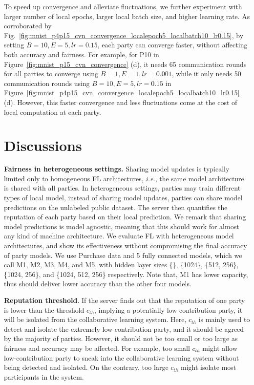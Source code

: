\documentclass{article}
\newcommand{\ie}{\textit{i.e.},\xspace}
\begin{document}
To speed up convergence and alleviate fluctuations, we further experiment with larger number of local epochs, larger local batch size, and higher learning rate. As corroborated by Fig.~\ref{fig:mnist_p4p15_cvn_convergence_localepoch5_localbatch10_lr0.15}, by setting $B=10, E=5, lr=0.15$, each party can converge faster, without affecting both accuracy and fairness. For example, for P10 in Figure~\ref{fig:mnist_p15_cvn_convergence} (d), it needs 65 communication rounds for all parties to converge using $B=1, E=1, lr=0.001$, while it only needs 50 communication rounds using $B=10, E=5, lr=0.15$ in Figure~\ref{fig:mnist_p4p15_cvn_convergence_localepoch5_localbatch10_lr0.15} (d). However, this faster convergence and less fluctuations come at the cost of local computation at each party.


\section{Discussions}
\label{sec:Discussion}
\textbf{Fairness in heterogeneous settings.} 
Sharing model updates is typically limited only to homogeneous FL architectures, \ie the same model architecture is shared with all parties. In heterogeneous settings, parties may train different types of local model, instead of sharing model updates, parties can share model predictions on the unlabeled public dataset. The server then quantifies the reputation of each party based on their local prediction. We remark that sharing model predictions is model agnostic, meaning that this should work for almost any kind of machine architecture.
We evaluate FL with heterogeneous model architectures, and show its effectiveness without compromising the final accuracy of party models.
We use Purchase data and 5 fully connected models, which we call M1, M2, M3, M4, and M5, with hidden layer sizes \{\}, \{1024\}, \{512, 256\}, \{1024, 256\}, and \{1024, 512, 256\} respectively. Note that, M1 has lower capacity, thus should deliver lower accuracy than the other four models.


\textbf{Reputation threshold}. If the server finds out that the reputation of one party is lower than the threshold $c_{th}$, implying a potentially low-contribution party, it will be isolated from the collaborative learning system. 
Here, $c_{th}$ is mainly used to detect and isolate the extremely low-contribution party, and it should be agreed by the majority of parties. 
However, it should not be too small or too large as fairness and accuracy may be affected. For example, too small $c_{th}$ might allow low-contribution party to sneak into the collaborative learning system without being detected and isolated. On the contrary, too large $c_{th}$ might isolate most participants in the system. 
\end{document}
